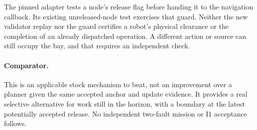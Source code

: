 \documentclass[11pt]{article}
\begin{document}
The pinned adapter tests a node's release flag before handing it to
the navigation callback. Its existing unreleased-node test exercises
that guard. Neither the new validator replay nor the guard certifies
a robot's physical clearance or the completion of an already
dispatched operation. A different action or source can still
occupy the bay, and that requires an independent check.

\paragraph{Comparator.}
This is an applicable stock mechanism to beat, not an improvement
over a planner given the same accepted anchor and update evidence.
It provides a real selective alternative for work still in the
horizon, with a boundary at the latest potentially accepted release.
No independent two-fault mission or I1 acceptance follows.
\end{document}
